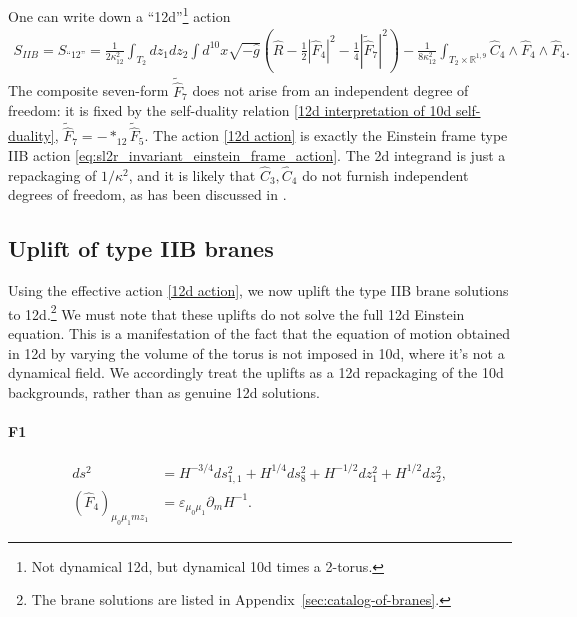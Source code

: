 One can write down a ``12d''\footnote{
Not dynamical 12d, but dynamical 10d times a 2-torus.
}
action
\begin{equation}
\begin{aligned}
S_{IIB}=
S_{\text{``12''}}
= \frac{1}{2\kappa_{12}^2}\int_{T_2}dz_1 dz_2\int d^{10}x
\sqrt{-\widehat{g}}
\left(
\widehat{R} - \frac{1}{2}|\widehat F_4|^2-\frac{1}{4}|\widetilde{\widehat{F}}_7|^2
\right)-\frac{1}{8\kappa_{12}^2}\int_{T_2\times \mathbb{R}^{1,9}}\widehat{C}_4\wedge \widehat{F}_4\wedge \widehat{F}_4.
\end{aligned}
\label{12d action}
\end{equation}
The composite seven-form $\widetilde{\widehat{F}}_7$ does not arise from an independent degree of freedom: it is fixed by the self-duality relation \eqref{12d interpretation of 10d self-duality}, $\widetilde{\widehat{F}}_7 = -*_{12}\widetilde{\widehat{F}}_5$. 
The action \eqref{12d action} is exactly the Einstein frame type IIB action \eqref{eq:sl2r_invariant_einstein_frame_action}.
The 2d integrand is just a repackaging of $1/\kappa^2$, and it is likely that $\widehat C_3, \widehat C_4$ do not furnish independent degrees of freedom, as has been discussed in \cite{Tseytlin:1996ne}.

\subsection{Uplift of type IIB branes}
Using the effective action \eqref{12d action}, we now uplift the type IIB brane solutions to 12d.\footnote{The brane solutions are listed in Appendix~\ref{sec:catalog-of-branes}.}
We must note that these uplifts do not solve the full 12d Einstein equation.
This is a manifestation of the fact that the equation of motion obtained in 12d by varying the volume of the torus is not imposed in 10d, where it's not a dynamical field.
We accordingly treat the uplifts as a 12d repackaging of the 10d backgrounds, rather than as genuine 12d solutions.

\paragraph{F1}
\begin{equation}
\begin{aligned}
ds^2
&= H^{-3/4}ds_{1,1}^2
+ H^{1/4}ds_8^2
+H^{-1/2}dz_1^2
+H^{1/2}dz_2^2,\\
(\widehat{F}_4)_{\mu_0 \mu_1 m z_1}
&= \varepsilon_{\mu_0 \mu_1}\partial_m H^{-1}.
\end{aligned}
\end{equation}

